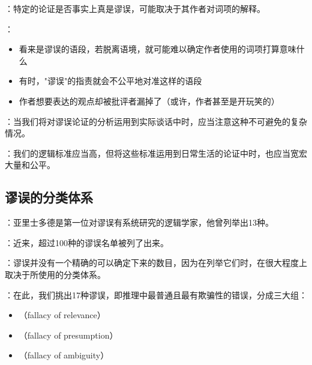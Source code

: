 \begin{theorembox}[title=语境依赖性问题]
：特定的论证是否事实上真是谬误，可能取决于其作者对词项的解释。

：
\begin{itemize}
  \item 看来是谬误的语段，若脱离语境，就可能难以确定作者使用的词项打算意味什么
  \item 有时，"谬误"的指责就会不公平地对准这样的语段
  \item 作者想要表达的观点却被批评者漏掉了（或许，作者甚至是开玩笑的）
\end{itemize}

：当我们将对谬误论证的分析运用到实际谈话中时，应当注意这种不可避免的复杂情况。

：我们的逻辑标准应当高，但将这些标准运用到日常生活的论证中时，也应当宽宏大量和公平。
\end{theorembox}

\subsection{谬误的分类体系}

\begin{theorembox}[title=谬误研究的历史发展]
：亚里士多德是第一位对谬误有系统研究的逻辑学家，他曾列举出13种\cite{aristotle}。

：近来，超过100种的谬误名单被列了出来\cite{fearnside1959}。

：谬误并没有一个精确的可以确定下来的数目，因为在列举它们时，在很大程度上取决于所使用的分类体系。
\end{theorembox}

\begin{theorembox}[title=本书的分类体系]
：在此，我们挑出17种谬误，即推理中最普通且最有欺骗性的错误，分成三大组：

\begin{itemize}
  \item {}（fallacy of relevance）
  \item {}（fallacy of presumption）
  \item {}（fallacy of ambiguity）\cite{joseph1916}
\end{itemize}
\end{theorembox}

